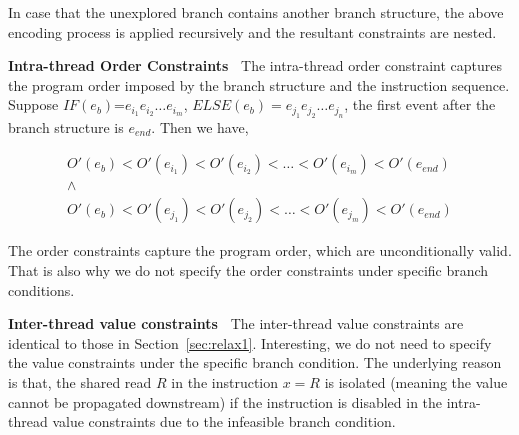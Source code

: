 In case that the unexplored branch contains another branch structure, the above encoding process is applied recursively and the resultant constraints are nested.



{\bf Intra-thread Order Constraints\ } The intra-thread order constraint captures the program order imposed by the branch structure and the instruction sequence. Suppose $IF(e_b)$=$e_{i_1}e_{i_2}\dots e_{i_m}$, $ELSE(e_b)=e_{j_1}e_{j_2}\dots e_{j_n}$, the first event after the branch structure is $e_{end}$. Then we have, 

$$
\begin{array}{l}
O'(e_b)<O'(e_{i_1})<O'(e_{i_2})<\dots <O'(e_{i_m})<O'(e_{end})\\
\wedge\\
O'(e_b)<O'(e_{j_1})<O'(e_{j_2})<\dots <O'(e_{j_m})<O'(e_{end})
\end{array}
$$

The order constraints capture the program order, which are unconditionally valid. That is also why we do not specify the order constraints under specific branch conditions. 

{\bf Inter-thread value constraints\ } The inter-thread value constraints are identical to those in Section~\ref{sec:relax1}. Interesting, we do not need to specify the value constraints under the specific branch condition. The underlying reason is that, the shared read  $R$ in the instruction $x=R$ is isolated (meaning the value cannot be propagated downstream) if the instruction is disabled in the intra-thread value constraints due to the infeasible branch condition. 




